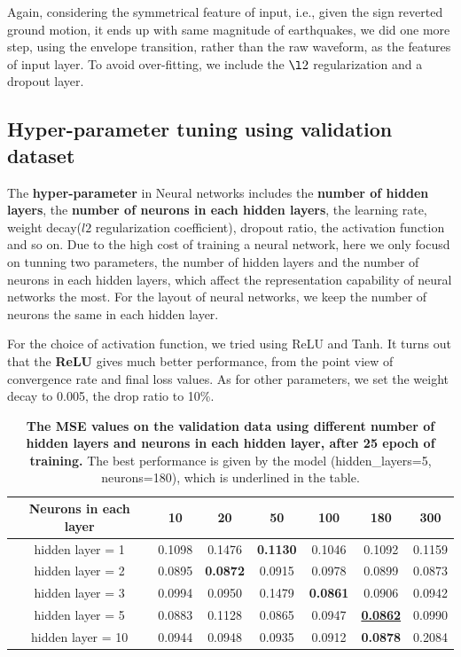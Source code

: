 \documentclass{article} %
\begin{document}
Again, considering the symmetrical feature of input, i.e., given the sign reverted ground motion, it ends up with same magnitude of earthquakes, we did one more step, using the envelope transition, rather than the raw waveform, as the features of input layer. To avoid over-fitting, we include the $\l2$ regularization and a dropout layer.

\subsection{Hyper-parameter tuning using validation dataset}
The \textbf{hyper-parameter} in Neural networks includes the \textbf{number of hidden layers}, the \textbf{number of neurons in each hidden layers}, the learning rate, weight decay($l2$ regularization coefficient), dropout ratio, the activation function and so on. Due to the high cost of training a neural network, here we only focusd on tunning two parameters, the number of hidden layers and the number of neurons in each hidden layers, which affect the representation capability of neural networks the most. For the layout of neural networks, we keep the number of neurons the same in each hidden layer.

For the choice of activation function, we tried using ReLU and Tanh. It turns out that the \textbf{ReLU} gives much better performance, from the point view of convergence rate and final loss values. As for other parameters, we set the weight decay to 0.005, the drop ratio to 10\%.



\begin{table}[htbp]
	\small
	\centering
	\begin{tabular}{@{}|c|c|c|c|c|c|c|@{}} %
		\hline
		Neurons in each layer & 10 & 20 & 50 & 100 & 180 & 300\\ 
		\cline{1-7} \hline \hline
		hidden layer = 1 & 0.1098 & 0.1476 & \textbf{0.1130} & 0.1046  & 0.1092 & 0.1159 \\
		
		hidden layer = 2 & 0.0895  & \textbf{0.0872} & 0.0915 & 0.0978 & 0.0899 & 0.0873 \\ 
		hidden layer = 3 &  0.0994 & 0.0950 & 0.1479 & \textbf{0.0861} & 0.0906  & 0.0942 \\ 
		 hidden layer = 5 & 0.0883 & 0.1128 & 0.0865 & 0.0947 & \textbf{\underline{0.0862}}  & 0.0990\\ 
		 hidden layer = 10 & 0.0944 & 0.0948 & 0.0935 & 0.0912 & \textbf{0.0878} & 0.2084  \\ \hline
	\end{tabular}
	\caption{{\bf The MSE values on the validation data using different number of hidden layers and neurons in each hidden layer, after 25 epoch of training.} The best performance is given by the model (hidden\_layers=5, neurons=180), which is underlined in the table.}
	\label{tab:nn_cv}
\end{table}
\end{document}
